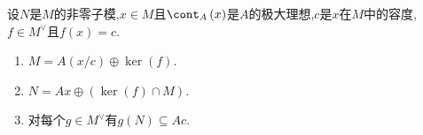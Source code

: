 \begin{proposition}{}{}
	设$N$是$M$的非零子模,$x\in M$且$\cont_{A}\left(x\right)$是$A$的极大理想,$c$是$x$在$M$中的容度,$f\in M^{\vee}$且$f\left(x\right)=c$.
	\begin{enumerate}
		\item $M=A\left(x/c\right)\oplus\ker\left(f\right)$.
		\item $N=Ax\oplus\left(\ker\left(f\right)\cap M\right)$.
		\item 对每个$g\in M^{\vee}$有$g\left(N\right)\subseteq Ac$.
	\end{enumerate}
\end{proposition}
